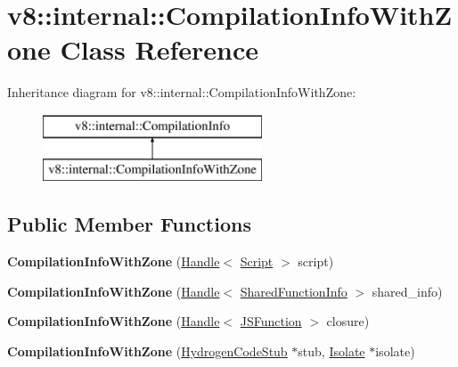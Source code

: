 \hypertarget{classv8_1_1internal_1_1_compilation_info_with_zone}{}\section{v8\+:\+:internal\+:\+:Compilation\+Info\+With\+Zone Class Reference}
\label{classv8_1_1internal_1_1_compilation_info_with_zone}
Inheritance diagram for v8\+:\+:internal\+:\+:Compilation\+Info\+With\+Zone\+:\begin{figure}[H]
\begin{center}
\leavevmode
\includegraphics[height=2.000000cm]{classv8_1_1internal_1_1_compilation_info_with_zone}
\end{center}
\end{figure}
\subsection*{Public Member Functions}
\begin{DoxyCompactItemize}
\item 
\hypertarget{classv8_1_1internal_1_1_compilation_info_with_zone_a3ec9c3e13f480666091a43a62eab909f}{}{\bfseries Compilation\+Info\+With\+Zone} (\hyperlink{classv8_1_1internal_1_1_handle}{Handle}$<$ \hyperlink{classv8_1_1internal_1_1_script}{Script} $>$ script)\label{classv8_1_1internal_1_1_compilation_info_with_zone_a3ec9c3e13f480666091a43a62eab909f}

\item 
\hypertarget{classv8_1_1internal_1_1_compilation_info_with_zone_aedc0ba81fab672fe86486e7279692b0a}{}{\bfseries Compilation\+Info\+With\+Zone} (\hyperlink{classv8_1_1internal_1_1_handle}{Handle}$<$ \hyperlink{classv8_1_1internal_1_1_shared_function_info}{Shared\+Function\+Info} $>$ shared\+\_\+info)\label{classv8_1_1internal_1_1_compilation_info_with_zone_aedc0ba81fab672fe86486e7279692b0a}

\item 
\hypertarget{classv8_1_1internal_1_1_compilation_info_with_zone_a6042e4e168c0a51250206dfd08220116}{}{\bfseries Compilation\+Info\+With\+Zone} (\hyperlink{classv8_1_1internal_1_1_handle}{Handle}$<$ \hyperlink{classv8_1_1internal_1_1_j_s_function}{J\+S\+Function} $>$ closure)\label{classv8_1_1internal_1_1_compilation_info_with_zone_a6042e4e168c0a51250206dfd08220116}

\item 
\hypertarget{classv8_1_1internal_1_1_compilation_info_with_zone_ae7e9276dbdc02f0bd0481eb055e5e0ba}{}{\bfseries Compilation\+Info\+With\+Zone} (\hyperlink{classv8_1_1internal_1_1_hydrogen_code_stub}{Hydrogen\+Code\+Stub} $\ast$stub, \hyperlink{classv8_1_1internal_1_1_isolate}{Isolate} $\ast$isolate)\label{classv8_1_1internal_1_1_compilation_info_with_zone_ae7e9276dbdc02f0bd0481eb055e5e0ba}

\end{DoxyCompactItemize}
